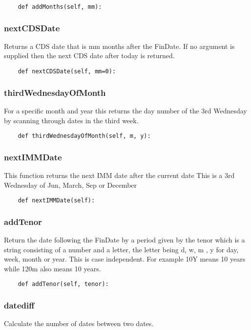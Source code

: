 \documentclass[twoside,11pt]{book}
\begin{document}
\begin{lstlisting}
    def addMonths(self, mm):
\end{lstlisting}

\subsubsection*{{\bf nextCDSDate}}
Returns a CDS date that is mm months after the FinDate. If no argument is supplied then the next CDS date after today is returned. 

\begin{lstlisting}
    def nextCDSDate(self, mm=0):
\end{lstlisting}

\subsubsection*{{\bf thirdWednesdayOfMonth}}
For a specific month and year this returns the day number of the 3rd Wednesday by scanning through dates in the third week.  

\begin{lstlisting}
    def thirdWednesdayOfMonth(self, m, y):
\end{lstlisting}

\subsubsection*{{\bf nextIMMDate}}
This function returns the next IMM date after the current date This is a 3rd Wednesday of Jun, March, Sep or December  

\begin{lstlisting}
    def nextIMMDate(self):
\end{lstlisting}

\subsubsection*{{\bf addTenor}}
Return the date following the FinDate by a period given by the tenor which is a string consisting of a number and a letter, the letter being d, w, m , y for day, week, month or year. This is case independent. For example 10Y means 10 years while 120m also means 10 years.  

\begin{lstlisting}
    def addTenor(self, tenor):
\end{lstlisting}

\subsubsection*{{\bf datediff}}
Calculate the number of dates between two dates.  
\end{document}
